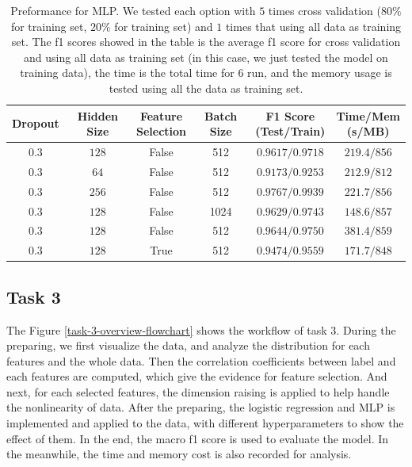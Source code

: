 \documentclass[11pt]{article}
\begin{document}
\begin{table}[H]
  \centering
  \begin{tabular}{|c|c|c|c|c|c|}
    \hline
    Dropout & Hidden Size & \makecell{Feature                                        \\ Selection} &Batch Size & \makecell{F1 Score \\ (Test/Train)} & \makecell{Time/Mem \\ (s/MB)} \\
    \hline
    $0.3$   & $128$       & False             & 512  & $0.9617/0.9718$ & $219.4/856$ \\
    \hline
    $0.3$   & $64$        & False             & 512  & $0.9173/0.9253$ & $212.9/812$ \\
    \hline
    $0.3$   & $256$       & False             & 512  & $0.9767/0.9939$ & $221.7/856$ \\
    \hline
    $0.3$   & $128$       & False             & 1024 & $0.9629/0.9743$ & $148.6/857$ \\
    \hline
    $0.3$   & $128$       & False             & 512  & $0.9644/0.9750$ & $381.4/859$ \\
    \hline
    $0.3$   & $128$       & True              & 512  & $0.9474/0.9559$ & $171.7/848$ \\
    \hline
  \end{tabular}
  \caption{Preformance for MLP. We tested each option with $5$ times cross validation ($80\%$ for training set, $20\%$ for training set) and $1$ times that using all data as training set. The f1 scores showed in the table is the average f1 score for cross validation and using all data as training set (in this case, we just tested the model on training data), the time is the total time for $6$ run, and the memory usage is tested using all the data as training set.}
  \label{task-2-result-2}
\end{table}

\subsection{Task 3}

The Figure \ref{task-3-overview-flowchart} shows the workflow of task 3. During the preparing, we first visualize the data, and analyze the distribution for each features and the whole data. Then the correlation coefficients between label and each features are computed, which give the evidence for feature selection. And next, for each selected features, the dimension raising is applied to help handle the nonlinearity of data. After the preparing, the logistic regression and MLP is implemented and applied to the data, with different hyperparameters to show the effect of them. In the end, the macro f1 score is used to evaluate the model. In the meanwhile, the time and memory cost is also recorded for analysis.
\end{document}
